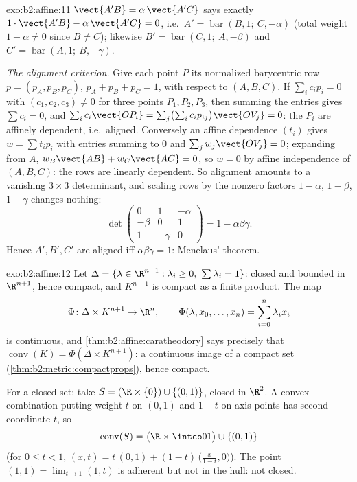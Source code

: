 \begin{solution}{exo:b2:affine:11}
$\vect{A'B} = \alpha\,\vect{A'C}$ says exactly $1\cdot
\vect{A'B} - \alpha\,\vect{A'C} = 0$, i.e.\ $A' =
\operatorname{bar}(B, 1;\ C, -\alpha)$ (total weight $1 -
\alpha \neq 0$ since $B \neq C$); likewise $B' =
\operatorname{bar}(C, 1;\ A, -\beta)$ and $C' =
\operatorname{bar}(A, 1;\ B, -\gamma)$.

\emph{The alignment criterion.} Give each point $P$ its
normalized barycentric row $p = (p_A, p_B, p_C)$, $p_A + p_B +
p_C = 1$, with respect to $(A, B, C)$. If $\sum_i c_i p_i = 0$
with $(c_1, c_2, c_3) \neq 0$ for three points $P_1, P_2,
P_3$, then summing the entries gives $\sum c_i = 0$, and
$\sum_i c_i \vect{OP_i} = \sum_j \bigl(\sum_i
c_ip_{ij}\bigr)\vect{OV_j} = 0$: the $P_i$ are affinely
dependent, i.e.\ aligned. Conversely an affine dependence
$(t_i)$ gives $w = \sum t_ip_i$ with entries summing to $0$
and $\sum_j w_j\vect{OV_j} = 0$; expanding from $A$, $w_B
\vect{AB} + w_C\vect{AC} = 0$, so $w = 0$ by affine
independence of $(A, B, C)$: the rows are linearly dependent.
So alignment amounts to a vanishing $3 \times 3$ determinant,
and scaling rows by the nonzero factors $1 - \alpha$, $1 -
\beta$, $1 - \gamma$ changes nothing:
\[
\det\begin{pmatrix} 0 & 1 & -\alpha\\ -\beta & 0 & 1\\ 1 &
-\gamma & 0\end{pmatrix}
= 1 - \alpha\beta\gamma .
\]
Hence $A', B', C'$ are aligned iff $\alpha\beta\gamma = 1$:
Menelaus' theorem.
\end{solution}

\begin{solution}{exo:b2:affine:12}
Let $\Delta = \{\lambda \in \R^{n+1} : \lambda_i \geq 0,\
\sum\lambda_i = 1\}$: closed and bounded in $\R^{n+1}$, hence
compact, and $K^{n+1}$ is compact as a finite product. The map
\[
\Phi \colon \Delta \times K^{n+1} \to \R^n, \qquad
\Phi(\lambda, x_0, \dots, x_n) = \sum_{i=0}^n \lambda_i x_i
\]
is continuous, and \cref{thm:b2:affine:caratheodory} says
precisely that $\operatorname{conv}(K) = \Phi(\Delta \times
K^{n+1})$: a continuous image of a compact set
(\cref{thm:b2:metric:compactprops}), hence compact.

For a closed set: take $S = (\R \times \{0\}) \cup \{(0,
1)\}$, closed in $\R^2$. A convex combination putting weight
$t$ on $(0,1)$ and $1 - t$ on axis points has second
coordinate $t$, so
\[
\operatorname{conv}(S) = \bigl(\R \times \intco01\bigr) \cup
\{(0,1)\}
\]
(for $0 \leq t < 1$, $(x, t) = t\,(0,1) + (1-t)\,\bigl(\tfrac
x{1-t}, 0\bigr)$). The point $(1, 1) = \lim_{t \to 1}(1, t)$
is adherent but not in the hull: not closed.
\end{solution}

